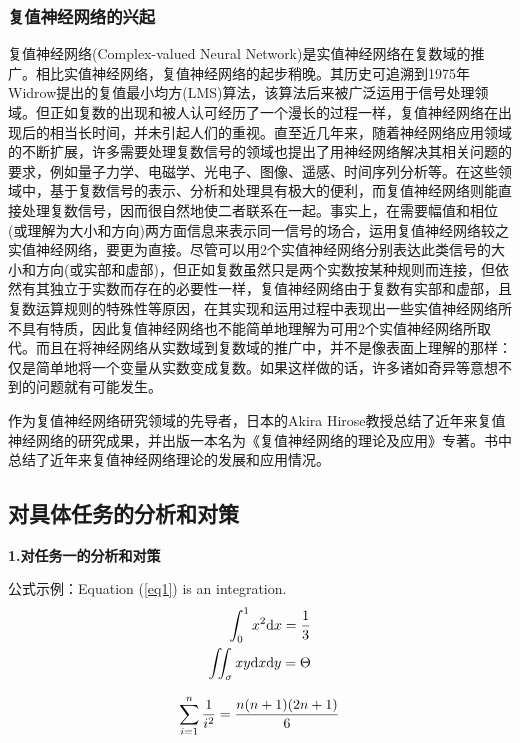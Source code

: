 \documentclass[no-math,bwprint]{YangThesis}
\begin{document}
\subsubsection{复值神经网络的兴起}

复值神经网络(Complex-valued Neural Network)是实值神经网络在复数域的推广。相比实值神经网络，复值神经网络的起步稍晚。其历史可追溯到1975年Widrow提出的复值最小均方(LMS)算法，该算法后来被广泛运用于信号处理领域\cite{bibc9}。但正如复数的出现和被人认可经历了一个漫长的过程一样，复值神经网络在出现后的相当长时间，并未引起人们的重视。直至近几年来，随着神经网络应用领域的不断扩展，许多需要处理复数信号的领域也提出了用神经网络解决其相关问题的要求，例如量子力学、电磁学、光电子、图像、遥感、时间序列分析等。在这些领域中，基于复数信号的表示、分析和处理具有极大的便利，而复值神经网络则能直接处理复数信号，因而很自然地使二者联系在一起。事实上，在需要幅值和相位(或理解为大小和方向)两方面信息来表示同一信号的场合，运用复值神经网络较之实值神经网络，要更为直接。尽管可以用2个实值神经网络分别表达此类信号的大小和方向(或实部和虚部)，但正如复数虽然只是两个实数按某种规则而连接，但依然有其独立于实数而存在的必要性一样，复值神经网络由于复数有实部和虚部，且复数运算规则的特殊性等原因，在其实现和运用过程中表现出一些实值神经网络所不具有特质，因此复值神经网络也不能简单地理解为可用2个实值神经网络所取代。而且在将神经网络从实数域到复数域的推广中，并不是像表面上理解的那样：仅是简单地将一个变量从实数变成复数。如果这样做的话，许多诸如奇异等意想不到的问题就有可能发生\cite{bibc10}。

作为复值神经网络研究领域的先导者，日本的Akira Hirose教授总结了近年来复值神经网络的研究成果，并出版一本名为《复值神经网络的理论及应用》专著\cite{bibc10}。书中总结了近年来复值神经网络理论的发展和应用情况。

\subsection{对具体任务的分析和对策}

{\bfseries\song1.对任务一的分析和对策}

公式示例：Equation (\ref{eq1}) is an integration.
\begin{equation}
\label{eq1}
\begin{split}
\int_0^1 x^2 \mathrm{d} x = \frac{1}{3}\\
\iint_\sigma xy\mathrm{d} x \mathrm{d} y = \Theta
\end{split}
\end{equation}

\begin{equation}
\displaystyle\sum\limits_{i=1}^{n} \frac{1}{i^2}=\frac{n(n+1)(2n+1)}{6}
\end{equation}
\end{document}
